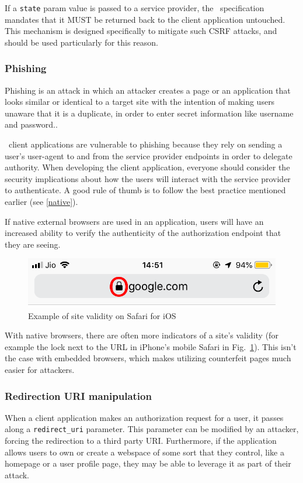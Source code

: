 If a \texttt{state} param value is passed to a service provider, the \oauth\ specification mandates that it MUST be returned back to the client application untouched. This mechanism is designed specifically to mitigate such CSRF attacks, and should be used particularly for this reason.

\subsubsection{Phishing}
Phishing is an attack in which an attacker creates a page or an application that looks similar or identical to a target site with the intention of making users unaware that it is a duplicate, in order to enter secret information like username and password..

\oauth\ client applications are vulnerable to phishing because they rely on sending a user's user-agent to and from the service provider endpoints in order to delegate authority. When developing the client application, everyone should consider the security implications about how the users will interact with the service provider to authenticate. A good rule of thumb is to follow the best practice mentioned earlier (see \ref{native}).

If native external browsers are used in an application, users will have an increased ability to verify the authenticity of the authorization endpoint that they are seeing.

\begin{figure}[ht]
    \centering
    \includegraphics[scale=0.55]{chapters/images/chp4/oie_toIlpPOFRMdK.png}
    \caption{Example of site validity on Safari for iOS}
    \label{fig:ioslock}
\end{figure}

With native browsers, there are often more indicators of a site's validity (for example the lock next to the URL in iPhone's mobile Safari in Fig.~\ref{fig:ioslock}). This isn't the case with embedded browsers, which makes utilizing counterfeit pages much easier for attackers.

\subsubsection{Redirection URI manipulation}
When a client application makes an authorization request for a user, it passes along a \texttt{redirect\_uri} parameter. This parameter can be modified by an attacker, forcing the redirection to a third party URI.
Furthermore, if the application allows users to own or create a webspace of some sort that they control, like a homepage or a user profile page, they may be able to leverage it as part of their attack.

